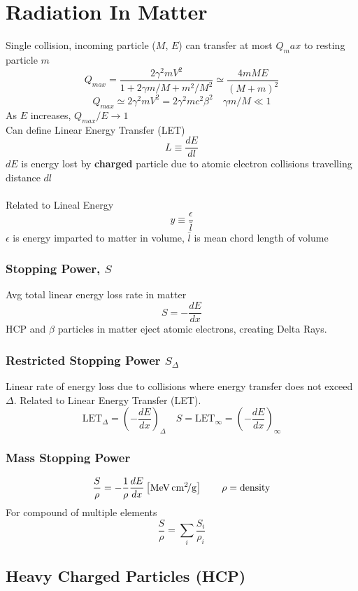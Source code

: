 \section{Radiation In Matter}
Single collision, incoming particle ($M$, $E$) can transfer at most $Q_max$ to resting particle $m$
\[ Q_{max} = \frac{2 \gamma^2 m V^2}{1 + 2 \gamma m / M + m^2 / M^2} \simeq \frac{4 m M E}{(M+m)^2} \]
\[ Q_{max} \simeq 2 \gamma^2 m V^2 = 2 \gamma^2 m c^2 \beta^2 \quad \gamma m / M \ll 1 \]
As $E$ increases, $Q_{max} / E \rightarrow 1$ \\

Can define Linear Energy Transfer (LET)
\[
L \equiv \frac{dE}{dl}
\]
$dE$ is energy lost by \textbf{charged} particle due to atomic electron collisions travelling distance $dl$ \\ \\
Related to Lineal Energy
\[
y \equiv \frac{\epsilon}{\bar{l}}
\]
$\epsilon$ is energy imparted to matter in volume, $\bar{l}$ is mean chord length of volume \\

\subsubsection{Stopping Power, $S$}
Avg total linear energy loss rate in matter
\[ S = -\frac{dE}{dx} \]
HCP and $\beta$ particles in matter eject atomic electrons, creating Delta Rays.

\subsubsection{Restricted Stopping Power $S_\Delta$}
Linear rate of energy loss due to collisions where energy transfer does not exceed $\Delta$. Related to Linear Energy Transfer (LET). 
\[
\text{LET}_\Delta = \left( - \frac{dE}{dx} \right)_\Delta \quad S = \text{LET}_\infty = \left( - \frac{dE}{dx} \right)_\infty
\]

\subsubsection{Mass Stopping Power}
\[
\frac{S}{\rho} = - \frac{1}{\rho} \frac{dE}{dx} \left[ \si[per-mode=symbol]{\mega\eV\square\centi\meter\per\gram} \right] \qquad
\rho = \text{density}
\]
For compound of multiple elements
\[
\frac{S}{\rho} = \sum_i \frac{S_i}{\rho_i}
\]

\subsection{Heavy Charged Particles (HCP)}
